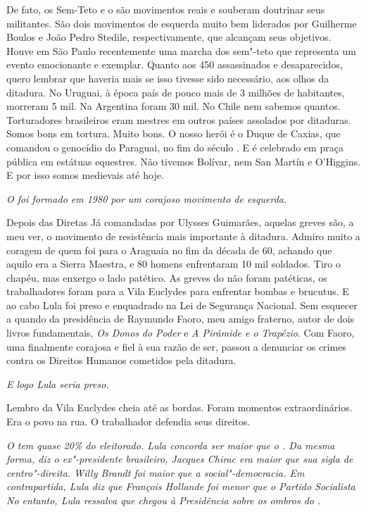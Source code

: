 \normalfont
De fato, os Sem-Teto e o  são movimentos reais e
souberam doutrinar seus militantes. São dois movimentos de esquerda
muito bem liderados por Guilherme Boulos e João Pedro Stedile,
respectivamente, que alcançam seus objetivos. Houve em São Paulo
recentemente uma marcha dos sem"-teto que representa um evento
emocionante e exemplar. Quanto aos 450 assassinados e desaparecidos,
quero lembrar que haveria mais se isso tivesse sido necessário, aos
olhos da ditadura. No Uruguai, à época país de pouco mais de 3 milhões
de habitantes, morreram 5 mil. Na Argentina foram 30 mil. No Chile nem
sabemos quantos. Torturadores brasileiros eram mestres em outros países
assolados por ditaduras. Somos bons em tortura. Muito bons. O nosso
herói é o Duque de Caxias, que comandou o genocídio do Paraguai, no fim
do século . E é celebrado em praça pública em estátuas equestres. Não
tivemos Bolívar, nem San Martín e O'Higgins. E por isso somos medievais
até hoje.

\itshape
 O  foi formado em 1980 por um corajoso movimento de
esquerda.

\normalfont
Depois das Diretas Já comandadas por Ulysses Guimarães,
aquelas greves são, a meu ver, o movimento de resistência mais
importante à ditadura. Admiro muito a coragem de quem foi para o
Araguaia no fim da década de 60, achando que aquilo era a Sierra
Maestra, e 80 homens enfrentaram 10 mil soldados. Tiro o chapéu, mas
enxergo o lado patético. As greves do  não foram patéticas, os
trabalhadores foram para a Vila Euclydes para enfrentar bombas e
brucutus. E ao cabo Lula foi preso e enquadrado na Lei de Segurança
Nacional. Sem esquecer a  quando da presidência de Raymundo Faoro,
meu amigo fraterno, autor de dois livros fundamentais, \emph{Os Donos}
\emph{do Poder} e \emph{A Pirâmide e o Trapézio}. Com Faoro, uma 
finalmente corajosa e fiel à sua razão de ser, passou a denunciar os
crimes contra os Direitos Humanos cometidos pela ditadura.

\itshape
 E logo Lula seria preso.

\normalfont
Lembro da Vila Euclydes cheia até as bordas. Foram
momentos extraordinários. Era o povo na rua. O trabalhador defendia seus
direitos.

\itshape
 O  tem quase 20\% do eleitorado. Lula concorda ser
maior que o . Da mesma forma, diz o ex"-presidente brasileiro, Jacques
Chirac era maior que sua sigla de centro"-direita. Willy Brandt foi maior
que a social"-democracia. Em contrapartida, Lula diz que François
Hollande foi menor que o Partido Socialista No entanto, Lula ressalva
que chegou à Presidência sobre os ombros do .


